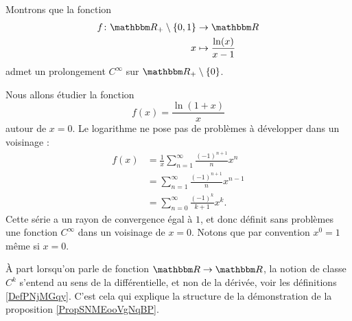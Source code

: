 \begin{example}
    Montrons que la fonction
    \begin{equation}
        \begin{aligned}
            f\colon \eR_+\setminus\{ 0,1 \}&\to \eR \\
            x&\mapsto \frac{ \ln(x) }{ x-1 } 
        \end{aligned}
    \end{equation}
    admet un prolongement \( C^{\infty}\) sur \( \eR_+\setminus\{ 0 \}\).

    Nous allons étudier la fonction
    \begin{equation}
        f(x)=\frac{ \ln(1+x) }{ x }
    \end{equation}
    autour de \( x=0\). Le logarithme ne pose pas de problèmes à développer dans un voisinage :
    \begin{subequations}
        \begin{align}
            f(x)&=\frac{1}{ x }\sum_{n=1}^{\infty}\frac{ (-1)^{n+1} }{ n }x^n\\
            &=\sum_{n=1}^{\infty}\frac{ (-1)^{n+1} }{ n }x^{n-1}\\
            &=\sum_{n=0}^{\infty}\frac{ (-1)^k }{ k+1 }x^k.
        \end{align}
    \end{subequations}
    Cette série a un rayon de convergence égal à \( 1\), et donc définit sans problèmes une fonction \( C^{\infty}\) dans un voisinage de \( x=0\). Notons que par convention \( x^0=1\) même si \( x=0\).
\end{example}

\begin{remark}
    À part lorsqu'on parle de fonction \( \eR\to \eR\), la notion de classe \( C^k\) s'entend au sens de la différentielle, et non de la dérivée, voir les définitions \ref{DefPNjMGqy}. C'est cela qui explique la structure de la démonstration de la proposition \ref{PropSNMEooVgNqBP}.
\end{remark}

